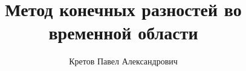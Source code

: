 %




\title{Метод конечных разностей во временной области}
\author{Кретов Павел Александрович}
\date{}


    
	
	
	
	
	
	
	
    

	
	
	

	
	
	

	
	

	
	

